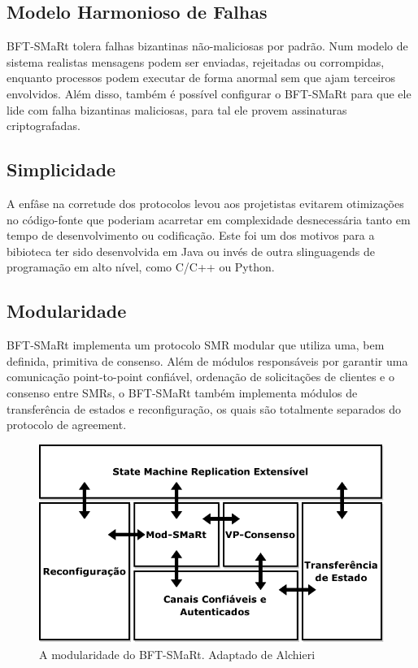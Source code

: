 		\subsection{Modelo Harmonioso de Falhas}
		BFT-SMaRt tolera falhas bizantinas não-maliciosas por padrão. Num modelo de sistema realistas mensagens podem ser enviadas, rejeitadas ou corrompidas, enquanto processos podem executar de forma anormal sem que ajam terceiros envolvidos. Além disso, também é possível configurar o BFT-SMaRt para que ele lide com falha bizantinas maliciosas, para tal ele provem assinaturas criptografadas. \\
		
		\subsection{Simplicidade}
		A enfâse na corretude dos protocolos levou aos projetistas evitarem otimizações no código-fonte que poderiam acarretar em complexidade desnecessária tanto em tempo de desenvolvimento ou codificação. Este foi um dos motivos para a bibioteca ter sido desenvolvida em Java ou invés de outra slinguagends de programação em alto nível, como C/C++ ou Python.\\
		
		\subsection{Modularidade}
		BFT-SMaRt implementa um protocolo SMR modular que utiliza uma, bem definida, primitiva de consenso. Além de módulos responsáveis por garantir uma comunicação point-to-point confiável, ordenação de solicitações de clientes e o consenso entre SMRs, o BFT-SMaRt também implementa módulos de transferência de estados e reconfiguração, os quais são totalmente separados do protocolo de agreement.\\
		
		\begin{figure}[htb]
			\begin{center}
				
				\includegraphics[clip,width=13.0cm]{images/image4.png}
				\caption{A modularidade do BFT-SMaRt. Adaptado de Alchieri~\cite{bessani3}}
				\label{fig:vis_sis}
			\end{center}
		\end{figure}
		
